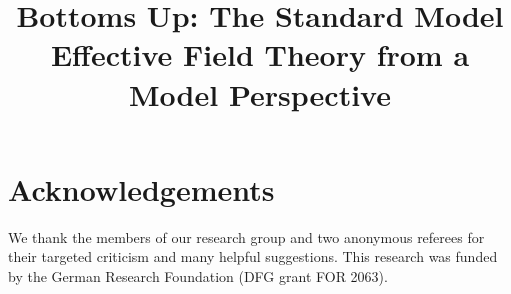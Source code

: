 \documentclass[letterpaper]{article}
\title{Bottoms Up: The Standard Model Effective Field Theory from a Model Perspective}
\author{%
}
\date{}
\begin{document}
\maketitle
















\section{Acknowledgements}
We thank the members of our research group and two anonymous referees for their targeted criticism and many helpful suggestions. This research was funded by the German Research Foundation (DFG grant FOR 2063). 



\end{document}
